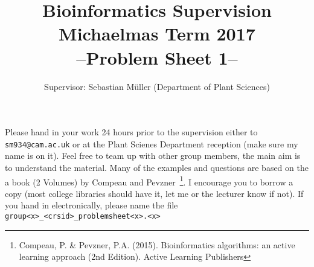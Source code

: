 \documentclass[11pt,runningheads,a4paper]{article}
\begin{document}

\title{{\LARGE Bioinformatics Supervision}\\
{\Large Michaelmas Term 2017}\\
{\Large --Problem Sheet 1--}} 

\author{Supervisor: Sebastian Müller (Department of Plant Sciences)}
\date{}

\maketitle

Please hand in your work 24 hours prior to the supervision either to \texttt{sm934@cam.ac.uk} or at the Plant Scienes Department reception (make sure my name is on it).
Feel free to team up with other group members, the main aim is to understand the material.
Many of the examples and questions are based on the a book (2 Volumes) by Compeau and Pevzner~\footnote{Compeau, P. \& Pevzner, P.A. (2015). Bioinformatics algorithms: an active learning approach (2nd Edition). Active Learning Publishers}. I encourage you to borrow a copy (most college libraries should have it, let me or the lecturer know if not).
If you hand in electronically, please name the file \texttt{group<x>\_<crsid>\_problemsheet<x>.<x>}
\end{document}
